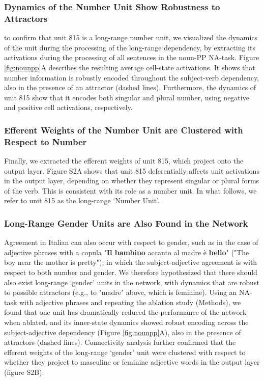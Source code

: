 \subsubsection{Dynamics of the Number Unit Show Robustness to Attractors} to confirm that unit 815 is a long-range number unit, we visualized the dynamics of the unit during the processing of the long-range dependency, by extracting its activations during the processing of all sentences in the noun-PP NA-task. Figure \ref{fig:nounpp}A describes the resulting average cell-state activations. It shows that number information is robustly encoded throughout the subject-verb dependency, also in the presence of an attractor (dashed lines). Furthermore, the dynamics of unit 815 show that it encodes both singular and plural number, using negative and positive cell activations, respectively. 

\subsubsection{Efferent Weights of the Number Unit are Clustered with Respect to Number}
Finally, we extracted the efferent weights of unit 815, which project onto the output layer. Figure S2A shows that unit 815 deferentially affects unit activations in the output layer, depending on whether they represent singular or plural forms of the verb. This is consistent with its role as a number unit. In what follows, we refer to unit 815 as the long-range `Number Unit'.

\subsubsection{Long-Range Gender Units are Also Found in the Network }
Agreement in Italian can also occur with respect to gender, such as in the case of adjective phrases with a copula  "\textbf{Il bambino} accanto al madre è \textbf{bello}" ("The boy near the mother is pretty"), in which the subject-adjective agreement is with respect to both number and gender. We therefore hypothesized that there should also exist long-range `gender' units in the network, with dynamics that are robust to possible attractors (e.g., to "madre" above, which is feminine). Using an NA-task with adjective phrases and repeating the ablation study (Methods), we found that one unit has dramatically reduced the performance of the network when ablated, and its inner-state dynamics showed robust encoding across the subject-adjective dependency (Figure \ref{fig:nounpp}A), also in the presence of attractors (dashed lines). Connectivity analysis further confirmed that the efferent weights of the long-range `gender' unit were clustered with respect to whether they project to masculine or feminine adjective words in the output layer (figure S2B).

